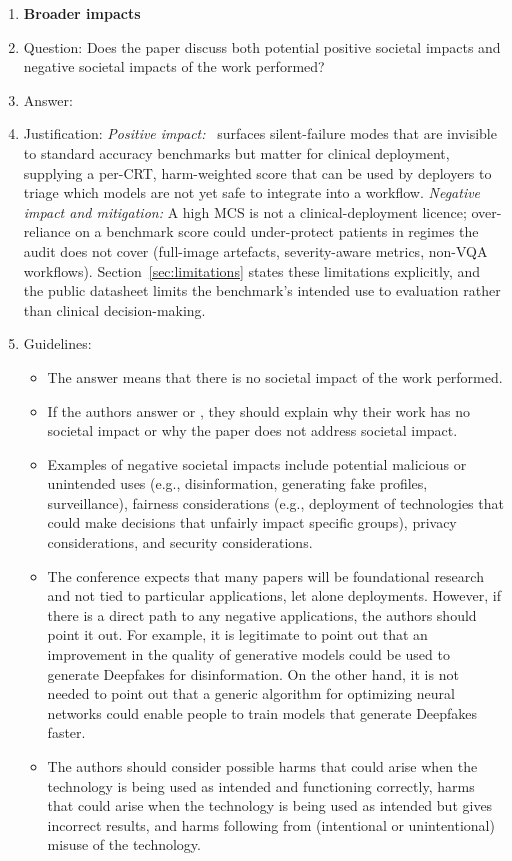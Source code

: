 \begin{enumerate}
\item {\bf Broader impacts}
    \item[] Question: Does the paper discuss both potential positive societal impacts and negative societal impacts of the work performed?
    \item[] Answer: \answerYes{}
    \item[] Justification: \emph{Positive impact:} \medvigil\ surfaces silent-failure modes that are invisible to standard accuracy benchmarks but matter for clinical deployment, supplying a per-CRT, harm-weighted score that can be used by deployers to triage which models are not yet safe to integrate into a workflow. \emph{Negative impact and mitigation:} A high MCS is not a clinical-deployment licence; over-reliance on a benchmark score could under-protect patients in regimes the audit does not cover (full-image artefacts, severity-aware metrics, non-VQA workflows). Section~\ref{sec:limitations} states these limitations explicitly, and the public datasheet limits the benchmark's intended use to evaluation rather than clinical decision-making.
    \item[] Guidelines:
    \begin{itemize}
        \item The answer \answerNA{} means that there is no societal impact of the work performed.
        \item If the authors answer \answerNA{} or \answerNo, they should explain why their work has no societal impact or why the paper does not address societal impact.
        \item Examples of negative societal impacts include potential malicious or unintended uses (e.g., disinformation, generating fake profiles, surveillance), fairness considerations (e.g., deployment of technologies that could make decisions that unfairly impact specific groups), privacy considerations, and security considerations.
        \item The conference expects that many papers will be foundational research and not tied to particular applications, let alone deployments. However, if there is a direct path to any negative applications, the authors should point it out. For example, it is legitimate to point out that an improvement in the quality of generative models could be used to generate Deepfakes for disinformation. On the other hand, it is not needed to point out that a generic algorithm for optimizing neural networks could enable people to train models that generate Deepfakes faster.
        \item The authors should consider possible harms that could arise when the technology is being used as intended and functioning correctly, harms that could arise when the technology is being used as intended but gives incorrect results, and harms following from (intentional or unintentional) misuse of the technology.

\end{itemize}
\end{enumerate}
